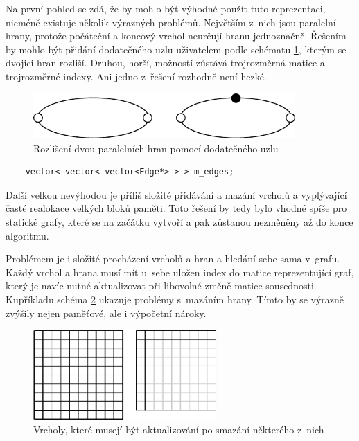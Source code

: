 \documentclass[11pt,twoside,a4paper]{book}
\begin{document}
Na první pohled se zdá, že by mohlo být výhodné použít tuto reprezentaci, nicméně existuje několik výrazných problémů. Největším z~nich jsou paralelní hrany, protože počáteční a koncový vrchol neurčují hranu jednoznačně. Řešením by mohlo být přidání dodatečného uzlu uživatelem podle schématu \ref{fig:parallel_edges}, kterým se dvojici hran rozliší. Druhou, horší, možností zůstává trojrozměrná matice a trojrozměrné indexy. Ani jedno z~řešení rozhodně není hezké.

\begin{figure}[ht]
\begin{center}
\includegraphics[width=10cm]{img/parallel_edges.pdf}
\caption{Rozlišení dvou paralelních hran pomocí dodatečného uzlu}
\label{fig:parallel_edges}
\end{center}
\end{figure}

\begin{verbatim}
    vector< vector< vector<Edge*> > > m_edges;
\end{verbatim}

Další velkou nevýhodou je příliš složité přidávání a mazání vrcholů a vyplývající časté realokace velkých bloků paměti. Toto řešení by tedy bylo vhodné spíše pro statické grafy, které se na začátku vytvoří a pak zůstanou nezměněny až do konce algoritmu.

Problémem je i složité procházení vrcholů a hran a hledání sebe sama v~grafu. Každý vrchol a hrana musí mít u~sebe uložen index do matice reprezentující graf, který je navíc nutné aktualizovat při libovolné změně matice sousednosti. Kupříkladu schéma \ref{fig:update_indices} ukazuje problémy s~mazáním hrany. Tímto by se výrazně zvýšily nejen paměťové, ale i výpočetní nároky.

\begin{figure}[ht]
\begin{center}
\includegraphics[width=7cm]{img/update_indices.pdf}
\caption{Vrcholy, které musejí být aktualizování po smazání některého z~nich}
\label{fig:update_indices}
\end{center}
\end{figure}
\end{document}
